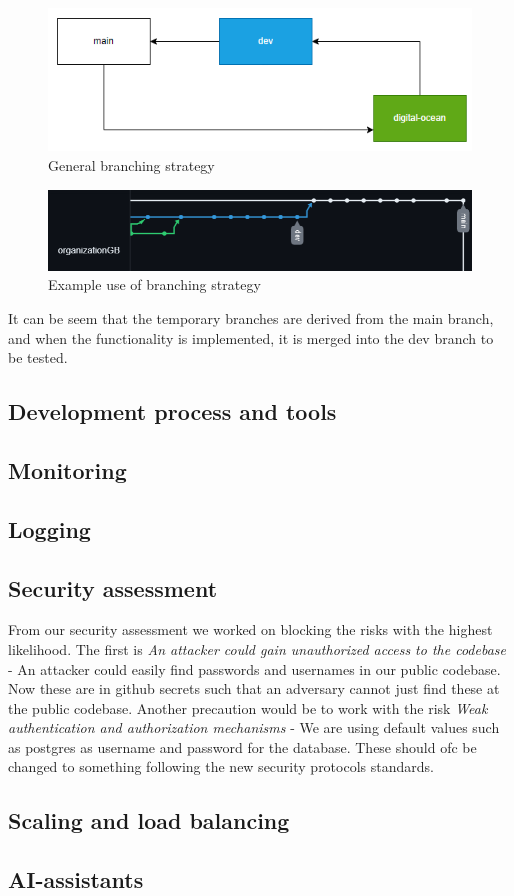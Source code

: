 \begin{figure}[H]
    \centering
    \captionsetup{justification=centering,margin=1cm}
    \includegraphics[width=0.7\linewidth]{report/images/branching.png}
    \caption{General branching strategy}
    \label{fig:gen_branch}
\end{figure}

\begin{figure}[H]
    \centering
    \captionsetup{justification=centering,margin=1cm}
    \includegraphics[width=0.7\linewidth]{report/images/git_branching.png}
    \caption{Example use of branching strategy}
    \label{fig:ex_branch}
\end{figure}

It can be seem that the temporary branches are derived from the main branch, and when the functionality is implemented, 
it is merged into the dev branch to be tested. 

\subsection{Development process and tools}



\subsection{Monitoring}

\subsection{Logging}

\subsection{Security assessment}
From our security assessment we worked on blocking the risks with the highest likelihood. The first is \textit{An attacker could gain unauthorized access to the codebase}
- An attacker could easily find passwords and usernames in our public codebase. Now these are in github secrets such that an adversary cannot just 
find these at the public codebase. Another precaution would be to work with the risk \textit{Weak authentication and authorization mechanisms}
 - We are using default values such as postgres as username and password for the database. These should ofc be changed to something following the
 new security protocols standards. 

 \subsection{Scaling and load balancing}

 \subsection{AI-assistants}